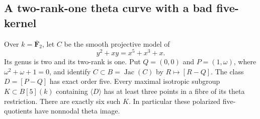 \subsection{A two-rank-one theta curve with a bad five-kernel}

\begin{proposition}
\label{prop:root-f1-bad-five-kernel}
Over $k=\overline{\mathbf F}_2$, let $C$ be the smooth projective
model of
\[
                 y^2+xy=x^5+x^3+x.
\]
Its genus is two and its two-rank is one. Put $Q=(0,0)$ and
$P=(1,\omega)$, where $\omega^2+\omega+1=0$, and identify
$C\subset B=\operatorname{Jac}(C)$ by $R\mapsto[R-Q]$.
The class $D=[P-Q]$ has exact order five. Every maximal isotropic
subgroup $K\subset B[5](k)$ containing $\langle D\rangle$
has at least three points in a fibre of its theta restriction.
There are exactly six such $K$. In particular these polarized
five-quotients have nonnodal theta image.
\end{proposition}
